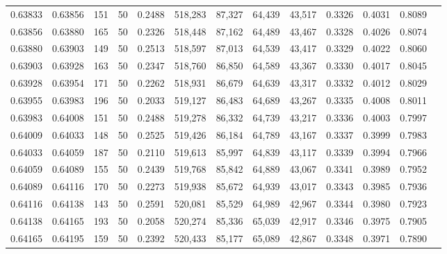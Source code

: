 \begin{tabular}{rrrrrrrrrrrrr}
0.63833 & 0.63856 &   151 &  50 &                                     0.2488 & 518,283 &  87,327 &  64,439 &  43,517 & 0.3326 & 0.4031 & 0.8089 \\
0.63856 & 0.63880 &   165 &  50 &                                     0.2326 & 518,448 &  87,162 &  64,489 &  43,467 & 0.3328 & 0.4026 & 0.8074 \\
0.63880 & 0.63903 &   149 &  50 &                                     0.2513 & 518,597 &  87,013 &  64,539 &  43,417 & 0.3329 & 0.4022 & 0.8060 \\
0.63903 & 0.63928 &   163 &  50 &                                     0.2347 & 518,760 &  86,850 &  64,589 &  43,367 & 0.3330 & 0.4017 & 0.8045 \\
0.63928 & 0.63954 &   171 &  50 &                                     0.2262 & 518,931 &  86,679 &  64,639 &  43,317 & 0.3332 & 0.4012 & 0.8029 \\
0.63955 & 0.63983 &   196 &  50 &                                     0.2033 & 519,127 &  86,483 &  64,689 &  43,267 & 0.3335 & 0.4008 & 0.8011 \\
0.63983 & 0.64008 &   151 &  50 &                                     0.2488 & 519,278 &  86,332 &  64,739 &  43,217 & 0.3336 & 0.4003 & 0.7997 \\
0.64009 & 0.64033 &   148 &  50 &                                     0.2525 & 519,426 &  86,184 &  64,789 &  43,167 & 0.3337 & 0.3999 & 0.7983 \\
0.64033 & 0.64059 &   187 &  50 &                                     0.2110 & 519,613 &  85,997 &  64,839 &  43,117 & 0.3339 & 0.3994 & 0.7966 \\
0.64059 & 0.64089 &   155 &  50 &                                     0.2439 & 519,768 &  85,842 &  64,889 &  43,067 & 0.3341 & 0.3989 & 0.7952 \\
0.64089 & 0.64116 &   170 &  50 &                                     0.2273 & 519,938 &  85,672 &  64,939 &  43,017 & 0.3343 & 0.3985 & 0.7936 \\
0.64116 & 0.64138 &   143 &  50 &                                     0.2591 & 520,081 &  85,529 &  64,989 &  42,967 & 0.3344 & 0.3980 & 0.7923 \\
0.64138 & 0.64165 &   193 &  50 &                                     0.2058 & 520,274 &  85,336 &  65,039 &  42,917 & 0.3346 & 0.3975 & 0.7905 \\
0.64165 & 0.64195 &   159 &  50 &                                     0.2392 & 520,433 &  85,177 &  65,089 &  42,867 & 0.3348 & 0.3971 & 0.7890 \\

\end{tabular}
